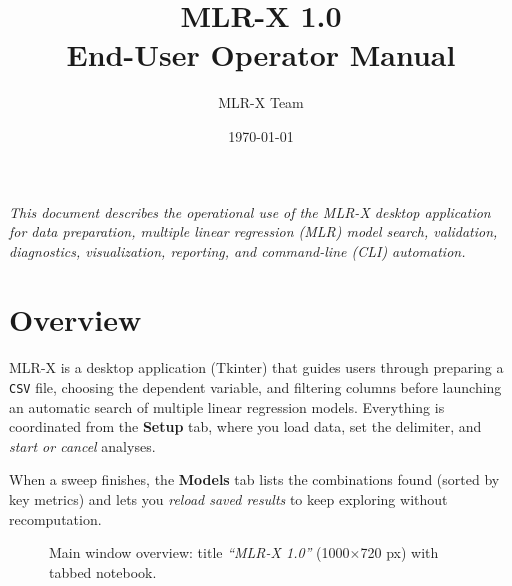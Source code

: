 \documentclass[12pt,a4paper]{article}
\title{\vspace{-1.2cm}\textbf{MLR-X 1.0}\\End-User Operator Manual}
\author{MLR-X Team}
\date{\today}
\begin{document}
\maketitle

\begin{center}
\textit{This document describes the operational use of the MLR-X desktop application for data preparation, multiple linear regression (MLR) model search, validation, diagnostics, visualization, reporting, and command-line (CLI) automation.}
\end{center}

\tableofcontents
\newpage

\section{Overview}
MLR-X is a desktop application (Tkinter) that guides users through preparing a \texttt{CSV} file, choosing the dependent variable, and filtering columns before launching an automatic search of multiple linear regression models. Everything is coordinated from the \textbf{Setup} tab, where you load data, set the delimiter, and \emph{start or cancel} analyses.

When a sweep finishes, the \textbf{Models} tab lists the combinations found (sorted by key metrics) and lets you \emph{reload saved results} to keep exploring without recomputation.

\begin{figure}[H]
  \centering
  \fbox{\rule[0pt]{0pt}{120pt}\hspace{0.9\linewidth}}
  \caption{Main window overview: title \emph{``MLR-X 1.0''} (1000$\times$720 px) with tabbed notebook.}
  \label{fig:main-window}
\end{figure}
\end{document}
